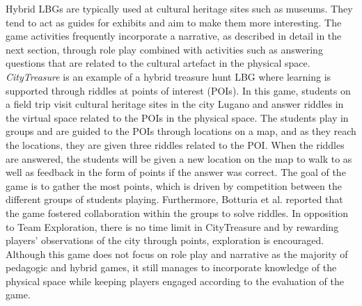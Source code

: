 Hybrid LBGs are typically used at cultural heritage sites such as museums\cite{LBG_Review}. They tend to act as guides for exhibits and aim to make them more interesting. The game activities frequently incorporate a narrative, as described in detail in the next section, through role play combined with activities such as answering questions that are related to the cultural artefact in the physical space. \textit{CityTreasure} is an example of a hybrid treasure hunt LBG where learning is supported through riddles at points of interest (POIs)\cite{botturi2009city}. In this game, students on a field trip visit cultural heritage sites in the city Lugano and answer riddles in the virtual space related to the POIs in the physical space. The students play in groups and are guided to the POIs through locations on a map, and as they reach the locations, they are given three riddles related to the POI. When the riddles are answered, the students will be given a new location on the map to walk to as well as feedback in the form of points if the answer was correct. The goal of the game is to gather the most points, which is driven by competition between the different groups of students playing. Furthermore, Botturia et al. reported that the game fostered collaboration within the groups to solve riddles\cite{botturi2009city}. In opposition to Team Exploration, there is no time limit in CityTreasure and by rewarding players' observations of the city through points, exploration is encouraged. Although this game does not focus on role play and narrative as the majority of pedagogic and hybrid games, it still manages to incorporate knowledge of the physical space while keeping players engaged according to the evaluation of the game\cite{botturi2009city}.



